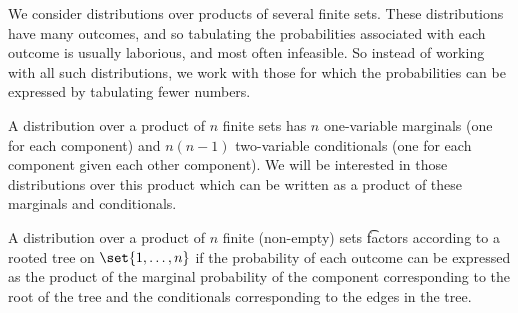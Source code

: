 
\sbasic










































\sstart
{}


We consider distributions over products of several finite sets.
These distributions have many outcomes, and so tabulating the probabilities associated with each outcome is usually laborious, and most often infeasible.
So instead of working with all such distributions, we work with those for which the probabilities can be expressed by tabulating fewer numbers.


A distribution over a product of $n$ finite sets has $n$ one-variable marginals (one for each component) and $n(n-1)$ two-variable conditionals (one for each component given each other component).
We will be interested in those distributions over this product which can be written as a product of these marginals and conditionals.

A distribution over a product of $n$ finite (non-empty) sets \t{factors according to a rooted tree} on $\set{1, \dots, n}$ if the probability of each outcome can be expressed as the product of the marginal probability of the component corresponding to the root of the tree and the conditionals corresponding to the edges in the tree.

